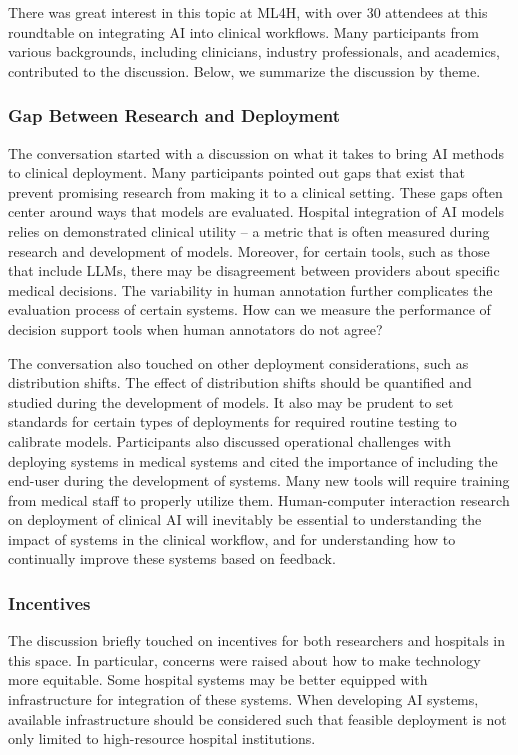 There was great interest in this topic at ML4H, with over 30 attendees at this roundtable on integrating AI into clinical workflows. Many participants from various backgrounds, including clinicians, industry professionals, and academics, contributed to the discussion. Below, we summarize the discussion by theme. 
 
\subsubsection{Gap Between Research and Deployment}
The conversation started with a discussion on what it takes to bring AI methods to clinical deployment. Many participants pointed out gaps that exist that prevent promising research from making it to a clinical setting. These gaps often center around ways that models are evaluated. Hospital integration of AI models relies on demonstrated clinical utility – a metric that is often measured during research and development of models. Moreover, for certain tools, such as those that include LLMs, there may be disagreement between providers about specific medical decisions.  The variability in human annotation further complicates the evaluation process of certain systems.  How can we measure the performance of decision support tools when human annotators do not agree?
 
The conversation also touched on other deployment considerations, such as distribution shifts.  The effect of distribution shifts should be quantified and studied during the development of models. It also may be prudent to set standards for certain types of deployments for required routine testing to calibrate models. 
Participants also discussed operational challenges with deploying systems in medical systems and cited the importance of including the end-user during the development of systems. Many new tools will require training from medical staff to properly utilize them. Human-computer interaction research on deployment of clinical AI will inevitably be essential to understanding the impact of systems in the clinical workflow, and for understanding how to continually improve these systems based on feedback. 

\subsubsection{Incentives}
The discussion briefly touched on incentives for both researchers and hospitals in this space. In particular, concerns were raised about how to make technology more equitable. Some hospital systems may be better equipped with infrastructure for integration of these systems. When developing AI systems, available infrastructure should be considered such that feasible deployment is not only limited to high-resource hospital institutions.
 
